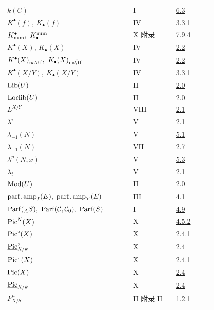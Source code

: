 \begin{longtable}{@{}>{\raggedright\arraybackslash}p{0.50\linewidth}>{\raggedright\arraybackslash}p{0.17\linewidth}>{\raggedright\arraybackslash}p{0.15\linewidth}@{}}
\(k(C)\) & I & \hyperlink{sga6.e01.para.6-3}{6.3}\\
\(K^\bullet(f),\ K_\bullet(f)\) & IV & \hyperlink{sga6.e04.para.3-3-1}{3.3.1}\\
\(K^\bullet_{\operatorname{num}},\ K^{\operatorname{num}}_\bullet\) & X 附录 & \hyperlink{sga6.e10.para.7-9-4}{7.9.4}\\
\(K^\bullet(X),\ K_\bullet(X)\) & IV & \hyperlink{sga6.e04.def.2-2}{2.2}\\
\(K^\bullet(X)_{\naif},\ K_\bullet(X)_{\naif}\) & IV & \hyperlink{sga6.e04.def.2-2}{2.2}\\
\(K^\bullet(X/Y),\ K_\bullet(X/Y)\) & IV & \hyperlink{sga6.e04.para.3-3-1}{3.3.1}\\
\(\operatorname{Lib}(U)\) & II & \hyperlink{sga6.e02.sec.2.0}{2.0}\\
\(\operatorname{Loclib}(U)\) & II & \hyperlink{sga6.e02.sec.2.0}{2.0}\\
\(\underline L^{X/Y}\) & VIII & \hyperlink{sga6.e08.para.2-1}{2.1}\\
\(\lambda^i\) & V & \hyperlink{sga6.e05.def.2-1}{2.1}\\
\(\lambda_{-1}(N)\) & V & \hyperlink{sga6.e05.para.5-1}{5.1}\\
\(\lambda_{-1}(N)\) & VII & \hyperlink{sga6.e07.prop.2-7}{2.7}\\
\(\lambda^p(N,x)\) & V & \hyperlink{sga6.e05.def.5-3}{5.3}\\
\(\lambda_t\) & V & \hyperlink{sga6.e05.def.2-1}{2.1}\\
\(\operatorname{Mod}(U)\) & II & \hyperlink{sga6.e02.sec.2.0}{2.0}\\
\(\parfamp_f(E),\ \parfamp_Y(E)\) & III & \hyperlink{sga6.e03.def.4-1}{4.1}\\
\(\Parf({}_A S),\ \Parf(\mathcal C,\mathcal C_0),\ \Parf(S)\) & I & \hyperlink{sga6.e01.notation.4-9}{4.9}\\
\(\operatorname{Pic}^N(X)\) & X & \hyperlink{sga6.e10.prop.4-5-2}{4.5.2}\\
\(\operatorname{Pic}^\circ(X)\) & X & \hyperlink{sga6.e10.def.2-4-1}{2.4.1}\\
\(\underline{\operatorname{Pic}}^{\circ}_{X/k}\) & X & \hyperlink{sga6.e10.sec.2.4}{2.4}\\
\(\operatorname{Pic}^\tau(X)\) & X & \hyperlink{sga6.e10.def.2-4-1}{2.4.1}\\
\(\operatorname{Pic}(X)\) & X & \hyperlink{sga6.e10.sec.2.4}{2.4}\\
\(\underline{\operatorname{Pic}}_{X/k}\) & X & \hyperlink{sga6.e10.sec.2.4}{2.4}\\
\(P^n_{X/S}\) & II 附录 II & \hyperlink{sga6.e02.para.1-2-1}{1.2.1}\\

\end{longtable}
